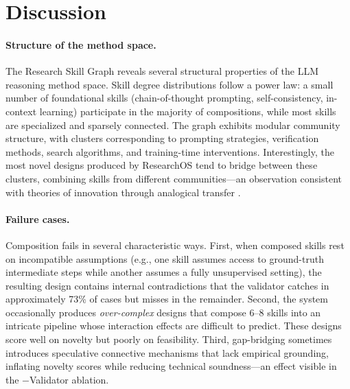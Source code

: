 \section{Discussion}
\label{sec:discussion}

\paragraph{Structure of the method space.}
The Research Skill Graph reveals several structural properties of the LLM reasoning method space. Skill degree distributions follow a power law: a small number of foundational skills (chain-of-thought prompting, self-consistency, in-context learning) participate in the majority of compositions, while most skills are specialized and sparsely connected. The graph exhibits modular community structure, with clusters corresponding to prompting strategies, verification methods, search algorithms, and training-time interventions. Interestingly, the most novel designs produced by ResearchOS tend to bridge between these clusters, combining skills from different communities---an observation consistent with theories of innovation through analogical transfer \cite{hope2017accelerating}.

\paragraph{Failure cases.}
Composition fails in several characteristic ways. First, when composed skills rest on incompatible assumptions (e.g., one skill assumes access to ground-truth intermediate steps while another assumes a fully unsupervised setting), the resulting design contains internal contradictions that the validator catches in approximately 73\% of cases but misses in the remainder. Second, the system occasionally produces \emph{over-complex} designs that compose 6--8 skills into an intricate pipeline whose interaction effects are difficult to predict. These designs score well on novelty but poorly on feasibility. Third, gap-bridging sometimes introduces speculative connective mechanisms that lack empirical grounding, inflating novelty scores while reducing technical soundness---an effect visible in the $-$Validator ablation.

